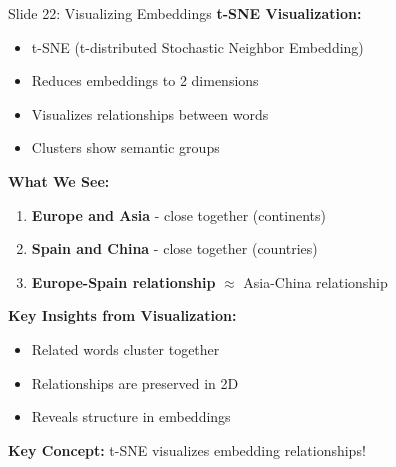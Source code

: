 \documentclass[8pt]{beamer}
\begin{document}
	\begin{frame}{Slide 22: Visualizing Embeddings}
		\fontsize{6.5}{7.5}\selectfont
		\textbf{t-SNE Visualization:}
		\begin{itemize}
			\item t-SNE (t-distributed Stochastic Neighbor Embedding)
			\item Reduces embeddings to 2 dimensions
			\item Visualizes relationships between words
			\item Clusters show semantic groups
		\end{itemize}
		
		\vspace{0.1cm}
		\textbf{What We See:}
		\begin{enumerate}
			\item \textbf{Europe and Asia} - close together (continents)
			\item \textbf{Spain and China} - close together (countries)
			\item \textbf{Europe-Spain relationship} $\approx$ Asia-China relationship
		\end{enumerate}
		
		\vspace{0.1cm}
		\textbf{Key Insights from Visualization:}
		\begin{itemize}
			\item Related words cluster together
			\item Relationships are preserved in 2D
			\item Reveals structure in embeddings
		\end{itemize}
		
		\textcolor{myblue}{\textbf{Key Concept:}} t-SNE visualizes embedding relationships!
	\end{frame}
	
\end{document}
